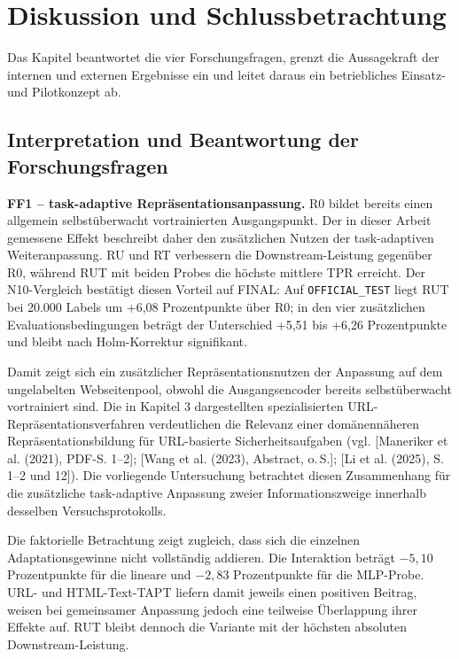 \chapter{Diskussion und Schlussbetrachtung}

Das Kapitel beantwortet die vier Forschungsfragen, grenzt die Aussagekraft der internen und
externen Ergebnisse ein und leitet daraus ein betriebliches Einsatz- und Pilotkonzept ab.


\section{Interpretation und Beantwortung der Forschungsfragen}

\textbf{FF1 -- task-adaptive Repräsentationsanpassung.}
R0 bildet bereits einen allgemein selbstüberwacht vortrainierten Ausgangspunkt. Der in dieser
Arbeit gemessene Effekt beschreibt daher den zusätzlichen Nutzen der task-adaptiven
Weiteranpassung. RU und RT verbessern die Downstream-Leistung gegenüber R0, während
RUT mit beiden Probes die höchste mittlere TPR erreicht. Der N10-Vergleich bestätigt diesen
Vorteil auf FINAL: Auf \nolinkurl{OFFICIAL_TEST} liegt RUT bei 20.000 Labels um
+6,08 Prozentpunkte über R0; in den vier zusätzlichen Evaluationsbedingungen beträgt der
Unterschied +5,51 bis +6,26 Prozentpunkte und bleibt nach Holm-Korrektur signifikant.

Damit zeigt sich ein zusätzlicher Repräsentationsnutzen der Anpassung auf dem ungelabelten
Webseitenpool, obwohl die Ausgangsencoder bereits selbstüberwacht vortrainiert sind.
Die in Kapitel 3 dargestellten spezialisierten URL-Repräsentationsverfahren verdeutlichen
die Relevanz einer domänennäheren Repräsentationsbildung für URL-basierte
Sicherheitsaufgaben (vgl. [Maneriker et al. (2021), PDF-S. 1--2]; [Wang et al. (2023), Abstract, o.\,S.]; [Li et al. (2025), S. 1--2 und 12]).
Die vorliegende Untersuchung betrachtet diesen Zusammenhang für die zusätzliche
task-adaptive Anpassung zweier Informationszweige innerhalb desselben Versuchsprotokolls.

Die faktorielle Betrachtung zeigt zugleich, dass sich die einzelnen Adaptationsgewinne nicht
vollständig addieren. Die Interaktion beträgt $-5{,}10$ Prozentpunkte für die lineare und
$-2{,}83$ Prozentpunkte für die MLP-Probe. URL- und HTML-Text-TAPT liefern damit jeweils
einen positiven Beitrag, weisen bei gemeinsamer Anpassung jedoch eine teilweise Überlappung
ihrer Effekte auf. RUT bleibt dennoch die Variante mit der höchsten absoluten
Downstream-Leistung.

